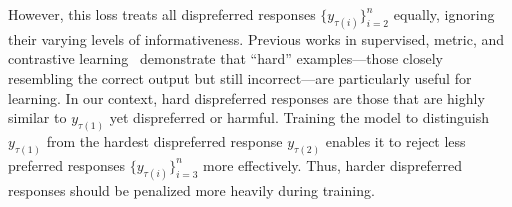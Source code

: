 However, this loss treats all dispreferred responses \(\{y_{\tau(i)}\}_{i=2}^n\) equally, ignoring their varying levels of informativeness. Previous works in supervised, metric, and contrastive learning~\cite{schroff2015facenet, oh2016deep, contrastivehard} demonstrate that “hard” examples—those closely resembling the correct output but still incorrect—are particularly useful for  learning. In our context, hard dispreferred responses are those that are highly similar to \(y_{\tau(1)}\) yet dispreferred or harmful. Training the model to distinguish \(y_{\tau(1)}\) from the hardest dispreferred response \(y_{\tau(2)}\) enables it to reject less preferred responses \(\{y_{\tau(i)}\}_{i=3}^n\) more effectively. Thus, harder dispreferred responses should be penalized more heavily during training.  




